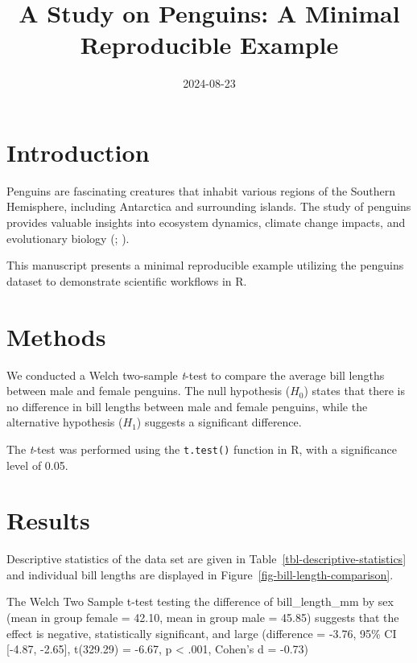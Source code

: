 \documentclass[
  man,
  longtable,
  a4paper,
  nolmodern,
  notxfonts,
  notimes,
  colorlinks=true,linkcolor=blue,citecolor=blue,urlcolor=blue]{apa7}
\title{A Study on Penguins: A Minimal Reproducible Example}
\date{2024-08-23}
\begin{document}
\maketitle


\setcounter{secnumdepth}{-\maxdimen} %

\setlength\LTleft{0pt}


\section{Introduction}\label{introduction}

Penguins are fascinating creatures that inhabit various regions of the
Southern Hemisphere, including Antarctica and surrounding islands. The
study of penguins provides valuable insights into ecosystem dynamics,
climate change impacts, and evolutionary biology
(; ).

This manuscript presents a minimal reproducible example utilizing the
penguins dataset to demonstrate scientific workflows in R.

\section{Methods}\label{methods}

We conducted a Welch two-sample \emph{t}-test to compare the average
bill lengths between male and female penguins. The null hypothesis
(\(H_0\)) states that there is no difference in bill lengths between
male and female penguins, while the alternative hypothesis (\(H_1\))
suggests a significant difference.

The \emph{t}-test was performed using the \texttt{t.test()} function in
R, with a significance level of 0.05.

\section{Results}\label{results}

Descriptive statistics of the data set are given in
Table~\ref{tbl-descriptive-statistics} and individual bill lengths are
displayed in Figure~\ref{fig-bill-length-comparison}.

The Welch Two Sample t-test testing the difference of bill\_length\_mm
by sex (mean in group female = 42.10, mean in group male = 45.85)
suggests that the effect is negative, statistically significant, and
large (difference = -3.76, 95\% CI {[}-4.87, -2.65{]}, t(329.29) =
-6.67, p \textless{} .001, Cohen's d = -0.73)
\end{document}
